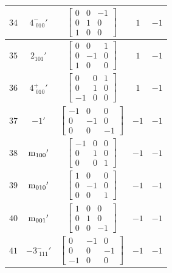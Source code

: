\documentclass[fleqn,8pt]{jsarticle}
\begin{document}
\begin{longtable}{ccccc}
$ 34 $ & $ 4^{-}_{\,\,010}{}' $ & $ \begin{bmatrix} 0 & 0 & -1 \\ 0 & 1 & 0 \\ 1 & 0 & 0 \end{bmatrix} $ & $ 1 $ & $ -1 $ \\ \hline
$ 35 $ & $ 2{}_{101}{}' $ & $ \begin{bmatrix} 0 & 0 & 1 \\ 0 & -1 & 0 \\ 1 & 0 & 0 \end{bmatrix} $ & $ 1 $ & $ -1 $ \\ \hline
$ 36 $ & $ 4^{+}_{\,\,010}{}' $ & $ \begin{bmatrix} 0 & 0 & 1 \\ 0 & 1 & 0 \\ -1 & 0 & 0 \end{bmatrix} $ & $ 1 $ & $ -1 $ \\ \hline
$ 37 $ & $ -1{}' $ & $ \begin{bmatrix} -1 & 0 & 0 \\ 0 & -1 & 0 \\ 0 & 0 & -1 \end{bmatrix} $ & $ -1 $ & $ -1 $ \\ \hline
$ 38 $ & $ {\rm m}_{100}{}' $ & $ \begin{bmatrix} -1 & 0 & 0 \\ 0 & 1 & 0 \\ 0 & 0 & 1 \end{bmatrix} $ & $ -1 $ & $ -1 $ \\ \hline
$ 39 $ & $ {\rm m}_{010}{}' $ & $ \begin{bmatrix} 1 & 0 & 0 \\ 0 & -1 & 0 \\ 0 & 0 & 1 \end{bmatrix} $ & $ -1 $ & $ -1 $ \\ \hline
$ 40 $ & $ {\rm m}_{001}{}' $ & $ \begin{bmatrix} 1 & 0 & 0 \\ 0 & 1 & 0 \\ 0 & 0 & -1 \end{bmatrix} $ & $ -1 $ & $ -1 $ \\ \hline
$ 41 $ & $ -3^{-}_{\,\,111}{}' $ & $ \begin{bmatrix} 0 & -1 & 0 \\ 0 & 0 & -1 \\ -1 & 0 & 0 \end{bmatrix} $ & $ -1 $ & $ -1 $ \\ \hline

\end{longtable}
\end{document}
